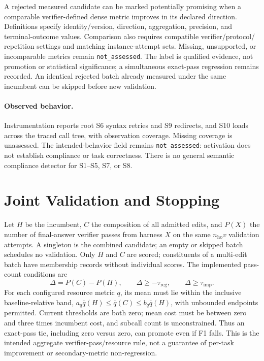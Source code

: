 A rejected measured candidate can be marked potentially promising when a
comparable verifier-defined dense metric improves in its declared direction.
Definitions specify identity/version, direction, aggregation, precision, and
terminal-outcome values. Comparison also requires compatible verifier/protocol/
repetition settings and matching instance-attempt sets. Missing, unsupported, or
incomparable metrics remain \texttt{not\_assessed}. The label is qualified
evidence, not promotion or statistical significance; a simultaneous exact-pass
regression remains recorded. An identical rejected batch already measured under
the same incumbent can be skipped before new validation.

\paragraph{Observed behavior.}
Instrumentation reports root S6 syntax retries and S9 redirects, and S10 loads
across the traced call tree, with observation coverage. Missing coverage is
unassessed. The intended-behavior field remains \texttt{not\_assessed}: activation
does not establish compliance or task correctness. There is no general semantic
compliance detector for S1--S5, S7, or S8.

\section{Joint Validation and Stopping}
\label{app:validation}
\label{app:algorithm}

Let $H$ be the incumbent, $C$ the composition of all admitted edits, and
$P(X)$ the number of final-answer verifier passes from harness $X$ on the same
$n_{\mathrm{ho}}v$ validation attempts. A singleton is the combined candidate;
an empty or skipped batch schedules no validation. Only $H$ and $C$ are scored;
constituents of a multi-edit batch have membership records without individual
scores. The implemented pass-count conditions are
\begin{equation}
\Delta=P(C)-P(H),\qquad
\Delta\geq-\tau_{\mathrm{reg}},\qquad
\Delta\geq\tau_{\mathrm{imp}}.
\label{eq:promotion}
\end{equation}
For each configured resource metric $q$, its mean must lie within the inclusive
baseline-relative band, $a_q\bar q(H)\leq\bar q(C)\leq b_q\bar q(H)$, with
unbounded endpoints permitted. Current thresholds are both zero; mean cost must
be between zero and three times incumbent cost, and subcall count is unconstrained.
Thus an exact-pass tie, including zero versus zero, can promote even if F1 falls.
This is the intended aggregate verifier-pass/resource rule, not a guarantee of
per-task improvement or secondary-metric non-regression.

